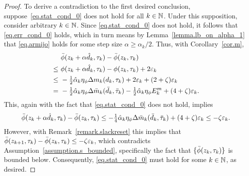 \begin{proof}
  To derive a contradiction to the first desired conclusion, suppose~\eqref{eq.stat_cond_0} does not hold for all $k \in \mathbb{N}$.  Under this supposition, consider arbitrary $k \in \mathbb{N}$.  Since \eqref{eq.stat_cond_0} does not hold, it follows that \eqref{eq.err_cond_0} holds, which in turn means by Lemma~\ref{lemma.lb_on_alpha_1} that \eqref{eq.armijo} holds for some step size $\alpha \geq \hat\alpha_k/2$.  Thus, with Corollary~\ref{cor.m},
  \begin{align}
    &\ {\bar \phi}(z_k + \alpha {\hat d}_k, \tau_k) -  {\bar \phi}(z_k, \tau_k) \nonumber \\
    \leq&\ \phi(z_k + \alpha {\hat d}_k, \tau_k) - \phi(z_k, \tau_k) + 2 \varepsilon_k \nonumber \\
    \leq&\ -\tfrac{1}{2} {\hat \alpha}_k \eta_\phi \Delta m_k(d_k, \tau_k) + 2 \varepsilon_k + (2 + \zeta) \varepsilon_k \nonumber \\
    =&\ -\tfrac{1}{2} {\hat \alpha}_k \eta_\phi \Delta {\bar m}_k({\bar d}_k, {\bar \tau}_k) - \tfrac{1}{2} {\hat \alpha}_k \eta_\phi E_k^m + (4 + \zeta) \varepsilon_k. \label{eq.tmp_thm_delta_m_0}
  \end{align}
  This, again with the fact that \eqref{eq.stat_cond_0} does not hold, implies
  \begin{equation*}
    {\bar \phi}(z_k + \alpha {\hat d}_k, \tau_k) -  {\bar \phi}(z_k, \tau_k) \leq - \tfrac14 \hat\alpha_k \eta_\phi \Delta  {\bar m}_k({\bar d}_k, {\bar \tau}_k) + (4 + \zeta) \varepsilon_k \leq -\zeta \varepsilon_k.
  \end{equation*}
  However, with Remark~\ref{remark.slackreset} this implies that ${\bar \phi}(z_{k+1}, \tau_k) -  {\bar \phi}(z_k, \tau_k) \leq - \zeta \varepsilon_k$, which contradicts Assumption~\ref{assumption.s_bounded}, specifically the fact that $\{{\bar \phi}(z_k,\tau_k)\}$ is bounded below.  Consequently, \eqref{eq.stat_cond_0} must hold for some $k \in \mathbb{N}$, as desired.


\end{proof}
